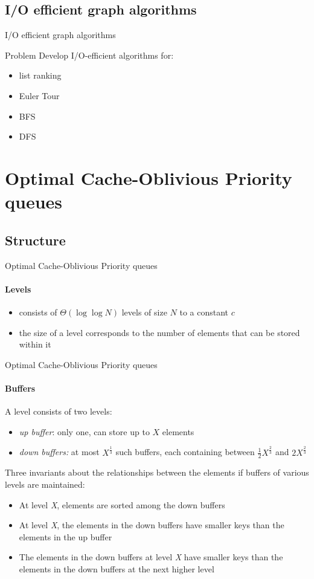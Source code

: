 \documentclass{beamer}
\begin{document}
\begin{darkframes}
	\subsection{I/O efficient graph algorithms}
    \begin{frame}{I/O efficient graph algorithms}
        \begin{block}{Problem}
        Develop I/O-efficient algorithms for:
        \begin{itemize}
        \item list ranking
        \item Euler Tour
        \item BFS
        \item DFS
        \end{itemize}
      \end{block}
    \end{frame}

	\section{Optimal Cache-Oblivious Priority queues}
    \subsection{Structure}
    \begin{frame}{Optimal Cache-Oblivious Priority queues}
    \framesubtitle{Levels}
    \begin{itemize}
    \item consists of \(\Theta(\log \log N)\) levels of size \(N\) to a constant \(c\)
    \item the size of a level corresponds to the number of elements that can be stored within it
    \end{itemize}
    \end{frame}

    \begin{frame}{Optimal Cache-Oblivious Priority queues}
    \framesubtitle{Buffers}
    A level consists of two levels:
    \begin{itemize}
    \item \textit{up buffer}: only one, can store up to \(X\) elements
    \item \textit{down buffers:} at most \(X^\frac{1}{3}\) such buffers, each containing between \(\frac{1}{2}X^\frac{2}{3}\) and \(2X^\frac{2}{3}\)
    \end{itemize}
    \bigskip
    Three invariants about the relationships between the elements if buffers of various levels are maintained:
    \begin{itemize}
    \item At level \textit{X}, elements are sorted among the down buffers
    \item At level \textit{X}, the elements in the down buffers have smaller keys than the elements in the up buffer
    \item The elements in the down buffers at level \textit{X} have smaller keys than the elements in the down buffers at the next higher level
    \end{itemize}
    \end{frame}


\end{darkframes}
\end{document}
